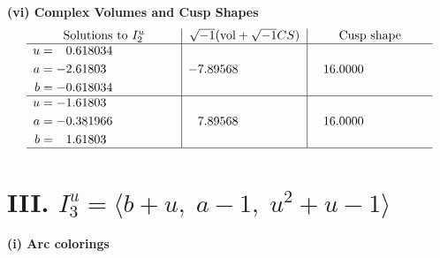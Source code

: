 \documentclass[1p]{elsarticle_modified}
\theoremstyle{definition}
\newcommand{\I}{\sqrt{-1}}
\begin{document}
\newpage\flushleft \textbf{(vi) Complex Volumes and Cusp Shapes}
$$\begin{array}{c|c|c}  
\text{Solutions to }I^u_{2}& \I (\text{vol} + \sqrt{-1}CS) & \text{Cusp shape}\\
 \hline 
\begin{aligned}
u &= \phantom{-}0.618034\phantom{ +0.000000I} \\
a &= -2.61803\phantom{ +0.000000I} \\
b &= -0.618034\phantom{ +0.000000I}\end{aligned}
 & -7.89568\phantom{ +0.000000I} & \phantom{-}16.0000\phantom{ +0.000000I} \\ \hline\begin{aligned}
u &= -1.61803\phantom{ +0.000000I} \\
a &= -0.381966\phantom{ +0.000000I} \\
b &= \phantom{-}1.61803\phantom{ +0.000000I}\end{aligned}
 & \phantom{-}7.89568\phantom{ +0.000000I} & \phantom{-}16.0000\phantom{ +0.000000I}\\
 \hline 
 \end{array}$$\newpage\newpage\renewcommand{\arraystretch}{1}
\centering \section*{III. $I^u_{3}= \langle b+u,\;a-1,\;u^2+u-1 \rangle$}
\flushleft \textbf{(i) Arc colorings}\\
\end{document}
